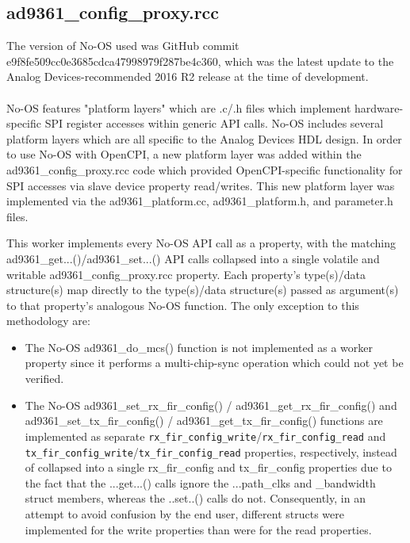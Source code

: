 \documentclass{article}
\def\comp{ad9361\_config\_proxy}
\begin{document}
\subsection*{\comp.rcc}
The version of No-OS used was GitHub commit e9f8fe509cc0e3685cdca47998979f287be4c360\cite{no_os_e9f8fe509cc0e3685cdca47998979f287be4c360}, which was the latest update to the Analog Devices-recommended 2016 R2 release at the time of development. \\ \\
No-OS features "platform layers" which are .c/.h files which implement hardware-specific SPI register accesses within generic API calls. No-OS includes several platform layers which are all specific to the Analog Devices HDL design\cite{adi_hdl_github}. In order to use No-OS with OpenCPI, a new platform layer was added within the \comp{}.rcc code which provided OpenCPI-specific functionality for SPI accesses via slave device property read/writes. This new platform layer was implemented via the ad9361\_platform.cc, ad9361\_platform.h, and parameter.h files. \\
\noindent \begin{sloppypar}
\noindent This worker implements every No-OS API call as a property, with the matching ad9361\_get...()/ad9361\_set...() API calls collapsed into a single volatile and writable \comp{}.rcc property. Each property's type(s)/data structure(s) map directly to the type(s)/data structure(s) passed as argument(s) to that property's analogous No-OS function. The only exception to this methodology are:
\begin{itemize}
	\item The No-OS ad9361\_do\_mcs() function is not implemented as a worker property since it performs a multi-chip-sync operation which could not yet be verified.
	\item The No-OS ad9361\_set\_rx\_fir\_config() / ad9361\_get\_rx\_fir\_config() and ad9361\_set\_tx\_fir\_config() / ad9361\_get\_tx\_fir\_config() functions are implemented as separate \verb+rx_fir_config_write+/\verb+rx_fir_config_read+ and \verb+tx_fir_config_write+/\verb+tx_fir_config_read+ properties, respectively, instead of collapsed into a single rx\_fir\_config and tx\_fir\_config properties due to the fact that the ...get...() calls ignore the ...path\_clks and \_bandwidth struct members, whereas the ..set..() calls do not. Consequently, in an attempt to avoid confusion by the end user, different structs were implemented for the write properties than were for the read properties.
\end{itemize}
\end{sloppypar}
\end{document}

